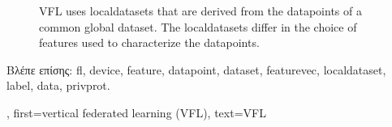{{\begin{figure}[H]
\begin{center}
			\end{center}
			\caption{VFL uses \gls{localdataset}s that are derived from the \gls{datapoint}s of a common global \gls{dataset}. 
				The \gls{localdataset}s differ in the choice of \gls{feature}s used to characterize the \gls{datapoint}s.\label{fig_vertical_FL_dict}}
		\end{figure}
    		 \foreignlanguage{greek}{Βλέπε επίσης:} \gls{fl}, \gls{device}, \gls{feature}, \gls{datapoint}, \gls{dataset}, \gls{featurevec}, 
		 \gls{localdataset}, \gls{label}, \gls{data}, \gls{privprot}.},
	first={vertical federated learning (VFL)},
	text={VFL}
} 

